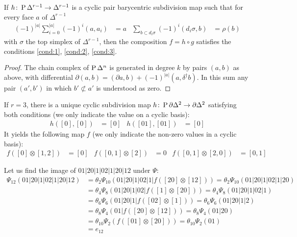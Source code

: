 \begin{proposition}
    If $h\colon \operatorname{P} \Delta^{r-1}\to \Delta^{r-1}$ is a cyclic pair barycentric subdivision map such that for every face $a$ of $\Delta^{r-1}$
    \begin{align*}
        (-1)^{|a|}\sum_{i=0}^{|a|}(-1)^i (a,a_i) &= a &
        \sum_{b\subset d_i\sigma}(-1)^i(d_i\sigma,b) &= \rho(b)
    \end{align*}
    with $\sigma$ the top simplex of $\Delta^{r-1}$, then the composition $f = h\circ g$ satisfies the conditions \eqref{cond:1}, \eqref{cond:2}, \eqref{cond:3}.
\end{proposition}
\begin{proof}
    The chain complex of $\operatorname{P} \Delta^n$ is generated in degree $k$ by pairs $(a,b)$ as above, with differential $\partial(a,b) = (\partial a,b) + (-1)^{|a|}(a,\delta^\dagger b)$. In this sum any pair $(a',b')$ in which $b'\not\subset a'$ is understood as zero. 
\end{proof}
If $r=3$, there is a unique cyclic subdivision map $h\colon \operatorname{P} \partial \Delta^{2}\to \partial \Delta^2$ satisfying both conditions (we only indicate the value on a cyclic basis):
\begin{align*}
    h([0],[0]) &= [0] &
    h([01],[01]) &= [0] 
\end{align*}
It yields the following map $f$ (we only indicate the non-zero values in a cyclic basis):
\begin{align*}
f([0]\otimes [1,2]) &= [0] & 
f([0,1]\otimes [2])&=0 &
f([0,1]\otimes [2,0]) &= [0,1]
\end{align*}
\begin{example}\label{ex:107}
    Let us find the image of $01|20|1|02|1|20|12$ under $\Psi$:
    \begin{align*}
        \Psi_{12}(01|20|1|02|1|20|12) &= \theta_2\Psi_{10}(01|20|1|02|1|f([20]\otimes[12])) = \theta_2\Psi_{10}(01|20|1|02|1|20)
        \\ &= \theta_4\Psi_8(01|20|1|02|f([1]\otimes [20])) = \theta_4\Psi_8(01|20|1|02|1)
        \\ &= \theta_6\Psi_6(01|20|1|f([02]\otimes [1])) = \theta_6\Psi_6(01|20|1|2)
        \\ &= \theta_8\Psi_4(01|f([20]\otimes [12])) = \theta_8\Psi_4(01|20)
        \\ &= \theta_{10}\Psi_2(f([01]\otimes [20])) = \theta_{10}\Psi_2(01) 
        \\ &= e_{12}
    \end{align*}
\end{example}
